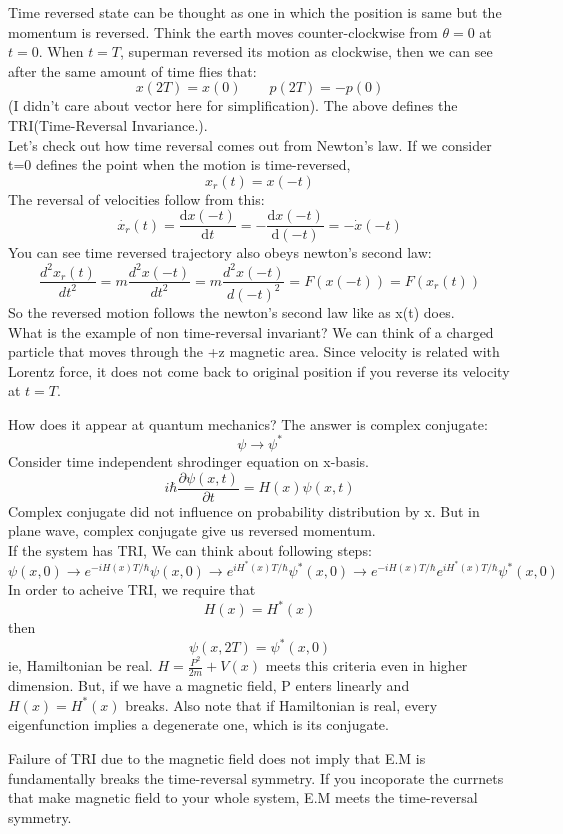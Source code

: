 \documentclass[a4paper,12pt]{article}
\begin{document}
Time reversed state can be thought as one in which the position is same but the momentum is reversed.
Think the earth moves counter-clockwise from \(\theta=0\) at \(t=0\). When \(t=T\), superman reversed its motion as
clockwise, then we can see after the same amount of time flies that:
\[
x(2T)=x(0) \qquad p(2T)=-p(0)
\]
(I didn't care about vector here for simplification). The above defines the TRI(Time-Reversal Invariance.). \\
\indent Let's check out how time reversal comes out from Newton's law.
If we consider t=0 defines the point when the motion is time-reversed,
\[
x_r (t)=x(-t)
\]
The reversal of velocities follow from this:
\[
\dot{x_r}(t)=\frac{\mathrm{d} x(-t)}{\mathrm{d} t}=-\frac{\mathrm{d} x(-t)}{\mathrm{d} (-t)}=-\dot{x}(-t)
\]
You can see time reversed trajectory also obeys newton's second law:
\[
\frac{d^2 x_r(t)}{d t^2}=m \frac{d^2 x(-t)}{d t^2}=m \frac{d^2 x(-t)}{d(-t)^2}=F(x(-t))=F\left(x_r(t)\right)
\]
So the reversed motion follows the newton's second law like as x(t) does.\\
\indent What is the example of non time-reversal invariant? We can think of a charged particle that moves through
the +z magnetic area. Since velocity is related with Lorentz force, it does not come back to original position
if you reverse its velocity at \(t=T\). 

\indent How does it appear at quantum mechanics? The answer is complex conjugate:
\[
\psi \rightarrow \psi^*
\]
Consider time independent shrodinger equation on x-basis. 
\[
i \hbar \frac{\partial \psi(x, t)}{\partial t}=H(x) \psi(x, t)
\]
Complex conjugate did not influence on probability distribution by x. But in plane wave, complex conjugate give us 
reversed momentum.\footnotemark
{}
\\
\indent If the system has TRI, We can think about following steps:
\[
\psi(x, 0) \rightarrow e^{-i H(x) T / \hbar} \psi(x, 0) \rightarrow e^{i H^*(x) T / \hbar} \psi^*(x, 0) \rightarrow e^{-i H(x) T / \hbar} e^{i H^*(x) T / \hbar} \psi^*(x, 0)
\]
In order to acheive TRI, we require that
\[
H(x)=H^*(x)
\]
then
\[
\psi(x, 2T)=\psi^*(x,0)
\]
ie, Hamiltonian be real. \(H=\frac{P^2}{2m}+V(x)\) meets this criteria even in higher dimension. But, if we have a 
magnetic field, P enters linearly and \(H(x)=H^*(x)\) breaks. Also note that if Hamiltonian is real, every eigenfunction 
implies a degenerate one, which is its conjugate.
\begin{remark}
  Failure of TRI due to the magnetic field does not imply that E.M is fundamentally breaks the time-reversal symmetry.
  If you incoporate the currnets that make magnetic field to your whole system, E.M meets the time-reversal symmetry.
\end{remark}
\end{document}
